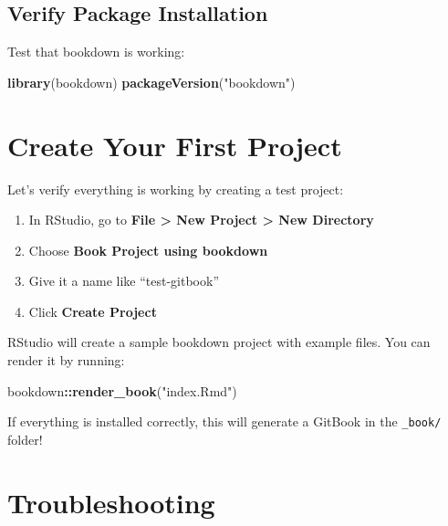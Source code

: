 \documentclass[
]{book}
\newenvironment{Shaded}{\begin{snugshade}}{\end{snugshade}}
\newcommand{\FunctionTok}[1]{\textcolor[rgb]{0.13,0.29,0.53}{\textbf{#1}}}
\newcommand{\NormalTok}[1]{#1}
\newcommand{\SpecialCharTok}[1]{\textcolor[rgb]{0.81,0.36,0.00}{\textbf{#1}}}
\newcommand{\StringTok}[1]{\textcolor[rgb]{0.31,0.60,0.02}{#1}}
\providecommand{\tightlist}{%
  \setlength{\itemsep}{0pt}\setlength{\parskip}{0pt}}
\begin{document}
\subsection{Verify Package Installation}\label{verify-package-installation}

Test that bookdown is working:

\begin{Shaded}
\begin{Highlighting}[]
\FunctionTok{library}\NormalTok{(bookdown)}
\FunctionTok{packageVersion}\NormalTok{(}\StringTok{"bookdown"}\NormalTok{)}
\end{Highlighting}
\end{Shaded}

\section{Create Your First Project}\label{create-your-first-project}

Let's verify everything is working by creating a test project:

\begin{enumerate}
\def\labelenumi{\arabic{enumi}.}
\tightlist
\item
  In RStudio, go to \textbf{File \textgreater{} New Project \textgreater{} New Directory}
\item
  Choose \textbf{Book Project using bookdown}
\item
  Give it a name like ``test-gitbook''
\item
  Click \textbf{Create Project}
\end{enumerate}

RStudio will create a sample bookdown project with example files. You can render it by running:

\begin{Shaded}
\begin{Highlighting}[]
\NormalTok{bookdown}\SpecialCharTok{::}\FunctionTok{render\_book}\NormalTok{(}\StringTok{"index.Rmd"}\NormalTok{)}
\end{Highlighting}
\end{Shaded}

If everything is installed correctly, this will generate a GitBook in the \texttt{\_book/} folder!

\section{Troubleshooting}\label{troubleshooting}
\end{document}
